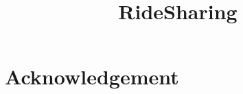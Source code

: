 \documentclass[]{vldb}
\title{RideSharing}
\author{}
\begin{document}
\maketitle

\begin{abstract}

\end{abstract}









\vspace{-0.1in}
\section*{Acknowledgement}

\begin{scriptsize}


\end{scriptsize}
\end{document}

